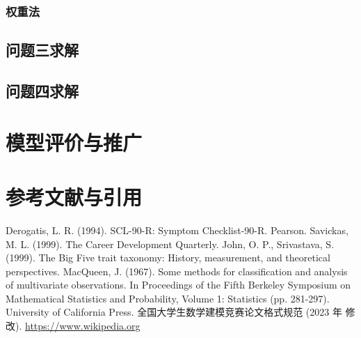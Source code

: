 \documentclass[withoutpreface,bwprint]{cumcmthesis} %
\begin{document}
\subsubsection{权重法}

\subsection{问题三求解}

\subsection{问题四求解}


\section{模型评价与推广}
\section{参考文献与引用}

\begin{thebibliography}{9}%
     Derogatis, L. R. (1994). SCL-90-R: Symptom Checklist-90-R. Pearson.
     Savickas, M. L. (1999). The Career Development Quarterly.
     John, O. P., Srivastava, S. (1999). The Big Five trait taxonomy: History, measurement, and theoretical perspectives.
    MacQueen, J. (1967). Some methods for classification and analysis of multivariate observations. In Proceedings of the Fifth Berkeley Symposium on Mathematical Statistics and Probability, Volume 1: Statistics (pp. 281-297). University of California Press.
        全国大学生数学建模竞赛论文格式规范 (2023 年 修改).
     \url{https://www.wikipedia.org}
\end{thebibliography}
\end{document}
